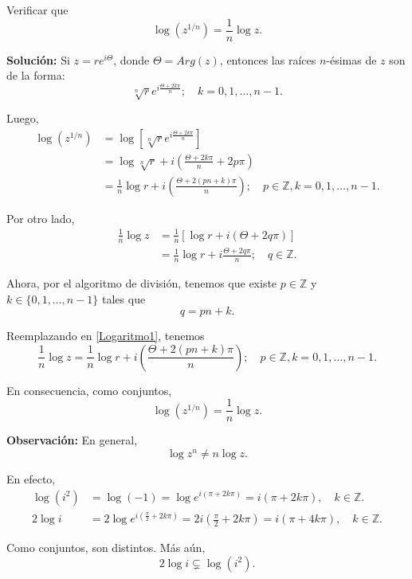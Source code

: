 \begin{ejemplo}
Verificar que 
$$\log\left( z^{1/n} \right) = \frac{1}{n} \log z.$$

\textbf{Solución:} Si $z = r e^{i\Theta}$, donde $\Theta = Arg(z)$, entonces las raíces $n$-ésimas de $z$ son de la forma: 
$$\sqrt[n]{r} e^{i \frac{\Theta + 2k\pi}{n}}; \quad k = 0, 1, \dots, n-1.$$

Luego, 
\begin{align*}
\log \left( z^{1/n}\right) &= \log \left[ \sqrt[n]{r} e^{i \frac{\Theta + 2k\pi}{n}} \right] \\
&= \log \sqrt[n]{r} + i \left( \frac{\Theta + 2k\pi}{n} + 2p\pi\right) \\
&= \frac{1}{n} \log r + i \left( \frac{\Theta + 2 (pn + k)\pi}{n}\right); \quad p \in \mathbb{Z}, k = 0,1, \dots, n-1.
\end{align*}

Por otro lado, 
\begin{align}
\frac{1}{n} \log z &= \frac{1}{n} [\log r + i (\Theta + 2q\pi)] \nonumber \\
&= \frac{1}{n} \log r + i \frac{\Theta + 2q\pi}{n}; \quad q \in \mathbb{Z}. \label{Logaritmo1}
\end{align}

Ahora, por el algoritmo de división, tenemos que existe $p \in \mathbb{Z}$ y $k \in \{0,1,\dots,n-1\}$ tales que
$$q = pn +k.$$

Reemplazando en \eqref{Logaritmo1}, tenemos
\begin{equation*}
\frac{1}{n} \log z = \frac{1}{n} \log r + i \left(\frac{\Theta + 2(pn+k)\pi}{n} \right); \quad p \in \mathbb{Z}, k = 0,1, \dots, n-1.
\end{equation*}

En consecuencia, como conjuntos,
$$\log\left( z^{1/n} \right) = \frac{1}{n} \log z.$$

\end{ejemplo}

\textbf{Observación:} En general, 
$$\log z^n \neq n \log z.$$

En efecto,
\begin{align*}
\log(i^2) &= \log(-1) = \log e^{i(\pi+2k\pi)} = i (\pi + 2k\pi), \quad k \in \mathbb{Z}. \\
2\log i &= 2 \log e^{i\left( \frac{\pi}{2} + 2k\pi\right)} = 2i \left(\frac{\pi}{2} + 2k\pi \right) = i(\pi + 4k\pi), \quad k \in \mathbb{Z}.
\end{align*}

Como conjuntos, son distintos. Más aún,
$$2 \log i \subsetneq  \log\left( i^2\right).$$

